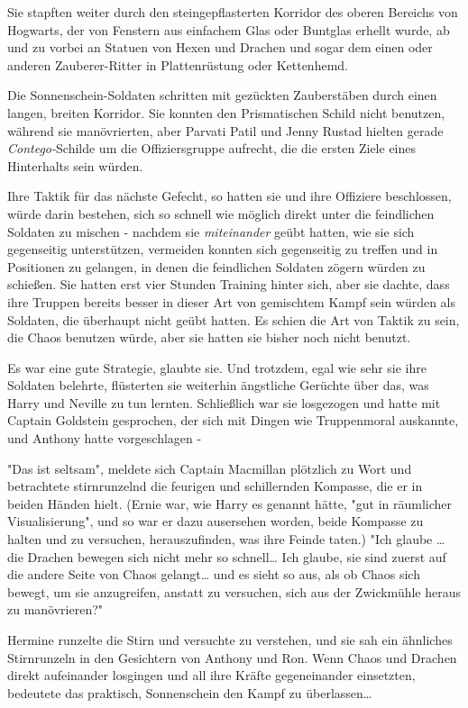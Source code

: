 {Sie stapften weiter durch den steingepflasterten Korridor des oberen Bereichs von Hogwarts, der von Fenstern aus einfachem Glas oder Buntglas erhellt wurde, ab und zu vorbei an Statuen von Hexen und Drachen und sogar dem einen oder anderen Zauberer-Ritter in Plattenrüstung oder Kettenhemd.

Die Sonnenschein-Soldaten schritten mit gezückten Zauberstäben durch einen langen, breiten Korridor. Sie konnten den Prismatischen Schild nicht benutzen, während sie manövrierten, aber Parvati Patil und Jenny Rustad hielten gerade \emph{Contego-}Schilde um die Offiziersgruppe aufrecht, die die ersten Ziele eines Hinterhalts sein würden.

Ihre Taktik für das nächste Gefecht, so hatten sie und ihre Offiziere beschlossen, würde darin bestehen, sich so schnell wie möglich direkt unter die feindlichen Soldaten zu mischen - nachdem sie \emph{miteinander} geübt hatten, wie sie sich gegenseitig unterstützen, vermeiden konnten sich gegenseitig zu treffen und in Positionen zu gelangen, in denen die feindlichen Soldaten zögern würden zu schießen. Sie hatten erst vier Stunden Training hinter sich, aber sie dachte, dass ihre Truppen bereits besser in dieser Art von gemischtem Kampf sein würden als Soldaten, die überhaupt nicht geübt hatten. Es schien die Art von Taktik zu sein, die Chaos benutzen würde, aber sie hatten sie bisher noch nicht benutzt.

Es war eine gute Strategie, glaubte sie. Und trotzdem, egal wie sehr sie ihre Soldaten belehrte, flüsterten sie weiterhin ängstliche Gerüchte über das, was Harry und Neville zu tun lernten. Schließlich war sie losgezogen und hatte mit Captain Goldstein gesprochen, der sich mit Dingen wie Truppenmoral auskannte, und Anthony hatte vorgeschlagen -

"Das ist seltsam", meldete sich Captain Macmillan plötzlich zu Wort und betrachtete stirnrunzelnd die feurigen und schillernden Kompasse, die er in beiden Händen hielt. (Ernie war, wie Harry es genannt hätte, "gut in räumlicher Visualisierung", und so war er dazu ausersehen worden, beide Kompasse zu halten und zu versuchen, herauszufinden, was ihre Feinde taten.) "Ich glaube … die Drachen bewegen sich nicht mehr so schnell… Ich glaube, sie sind zuerst auf die andere Seite von Chaos gelangt… und es sieht so aus, als ob Chaos sich bewegt, um sie anzugreifen, anstatt zu versuchen, sich aus der Zwickmühle heraus zu manövrieren?"

Hermine runzelte die Stirn und versuchte zu verstehen, und sie sah ein ähnliches Stirnrunzeln in den Gesichtern von Anthony und Ron. Wenn Chaos und Drachen direkt aufeinander losgingen und all ihre Kräfte gegeneinander einsetzten, bedeutete das praktisch, Sonnenschein den Kampf zu überlassen…

}
